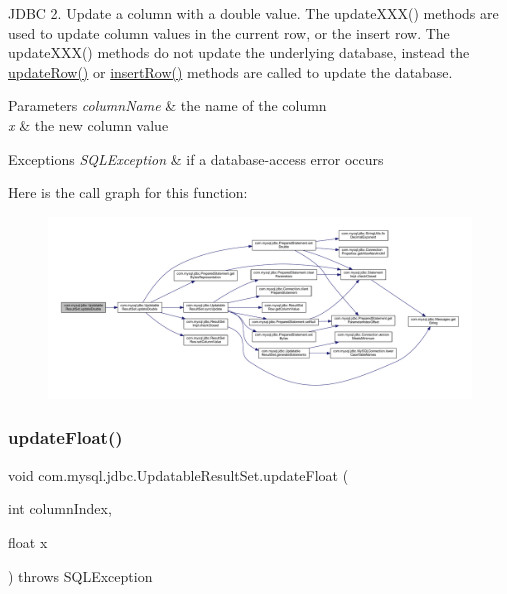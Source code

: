 J\+D\+BC 2. Update a column with a double value. The update\+X\+X\+X() methods are used to update column values in the current row, or the insert row. The update\+X\+X\+X() methods do not update the underlying database, instead the \mbox{\hyperlink{classcom_1_1mysql_1_1jdbc_1_1_updatable_result_set_a919969ba4b3c7cbc7b18605e9f31a746}{update\+Row()}} or \mbox{\hyperlink{classcom_1_1mysql_1_1jdbc_1_1_updatable_result_set_aef041f8d9d0778083716fc26652648fa}{insert\+Row()}} methods are called to update the database.


\begin{DoxyParams}{Parameters}
{\em column\+Name} & the name of the column \\
\hline
{\em x} & the new column value\\
\hline
\end{DoxyParams}

\begin{DoxyExceptions}{Exceptions}
{\em S\+Q\+L\+Exception} & if a database-\/access error occurs \\
\hline
\end{DoxyExceptions}
Here is the call graph for this function\+:
\nopagebreak
\begin{figure}[H]
\begin{center}
\leavevmode
\includegraphics[width=350pt]{classcom_1_1mysql_1_1jdbc_1_1_updatable_result_set_a0f22f27383615d4803d4355a612970aa_cgraph}
\end{center}
\end{figure}
\mbox{\label{classcom_1_1mysql_1_1jdbc_1_1_updatable_result_set_ac6b973ec7d85c1a9ef8d3376931a8dd2}} 
\subsubsection{\texorpdfstring{update\+Float()}{updateFloat()}\hspace{0.1cm}{\footnotesize\ttfamily [1/2]}}
{\footnotesize\ttfamily void com.\+mysql.\+jdbc.\+Updatable\+Result\+Set.\+update\+Float (\begin{DoxyParamCaption}\item[{int}]{column\+Index,  }\item[{float}]{x }\end{DoxyParamCaption}) throws S\+Q\+L\+Exception}

